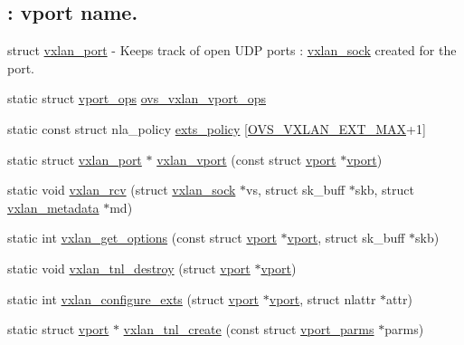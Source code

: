\subsection*{\+: vport name.}
\label{_amgrp11b33af0c85e2c8a3c03b696f666e431}%
struct \hyperlink{structvxlan__port}{vxlan\+\_\+port} -\/ Keeps track of open U\+D\+P ports \+: \hyperlink{structvxlan__sock}{vxlan\+\_\+sock} created for the port. \begin{DoxyCompactItemize}
\item 
static struct \hyperlink{structvport__ops}{vport\+\_\+ops} \hyperlink{linux_2vport-vxlan_8c_a14100e1b742c7bb52f41541582330814}{ovs\+\_\+vxlan\+\_\+vport\+\_\+ops}
\item 
static const struct nla\+\_\+policy \hyperlink{linux_2vport-vxlan_8c_a8bca1dc2eb9e18c687ef067cae154b8b}{exts\+\_\+policy} \mbox{[}\hyperlink{openvswitch_8h_ac764e78fe2e06d11f39448e337292c7c}{O\+V\+S\+\_\+\+V\+X\+L\+A\+N\+\_\+\+E\+X\+T\+\_\+\+M\+A\+X}+1\mbox{]}
\item 
static struct \hyperlink{structvxlan__port}{vxlan\+\_\+port} $\ast$ \hyperlink{linux_2vport-vxlan_8c_ab19470f9c73474113f37dc3c65265294}{vxlan\+\_\+vport} (const struct \hyperlink{structvport}{vport} $\ast$\hyperlink{structvport}{vport})
\item 
static void \hyperlink{linux_2vport-vxlan_8c_a0b39f553c071625dac0570f97ef7924a}{vxlan\+\_\+rcv} (struct \hyperlink{structvxlan__sock}{vxlan\+\_\+sock} $\ast$vs, struct sk\+\_\+buff $\ast$skb, struct \hyperlink{structvxlan__metadata}{vxlan\+\_\+metadata} $\ast$md)
\item 
static int \hyperlink{linux_2vport-vxlan_8c_a50ef73121a1de8be6425c76ea97fc3da}{vxlan\+\_\+get\+\_\+options} (const struct \hyperlink{structvport}{vport} $\ast$\hyperlink{structvport}{vport}, struct sk\+\_\+buff $\ast$skb)
\item 
static void \hyperlink{linux_2vport-vxlan_8c_aade4bb74066fe5f4ab11820ab7c90485}{vxlan\+\_\+tnl\+\_\+destroy} (struct \hyperlink{structvport}{vport} $\ast$\hyperlink{structvport}{vport})
\item 
static int \hyperlink{linux_2vport-vxlan_8c_a1c323f01bc67db23967f87810a23939b}{vxlan\+\_\+configure\+\_\+exts} (struct \hyperlink{structvport}{vport} $\ast$\hyperlink{structvport}{vport}, struct nlattr $\ast$attr)
\item 
static struct \hyperlink{structvport}{vport} $\ast$ \hyperlink{linux_2vport-vxlan_8c_a15944f1b89ca72bfaf953d278bf09ca7}{vxlan\+\_\+tnl\+\_\+create} (const struct \hyperlink{structvport__parms}{vport\+\_\+parms} $\ast$parms)

\end{DoxyCompactItemize}
